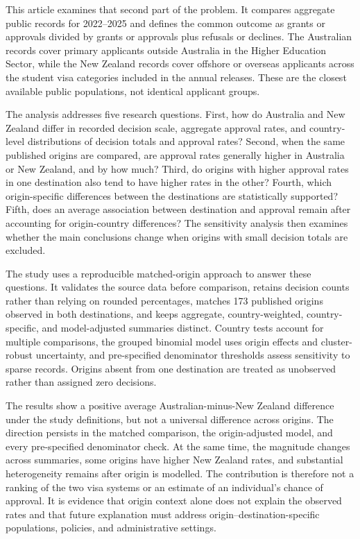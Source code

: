 \documentclass[runningheads]{llncs}
\begin{document}
This article examines that second part of the problem. It compares aggregate public records for 2022--2025 and defines the common outcome as grants or approvals divided by grants or approvals plus refusals or declines. The Australian records cover primary applicants outside Australia in the Higher Education Sector, while the New Zealand records cover offshore or overseas applicants across the student visa categories included in the annual releases. These are the closest available public populations, not identical applicant groups.

The analysis addresses five research questions. First, how do Australia and New Zealand differ in recorded decision scale, aggregate approval rates, and country-level distributions of decision totals and approval rates? Second, when the same published origins are compared, are approval rates generally higher in Australia or New Zealand, and by how much? Third, do origins with higher approval rates in one destination also tend to have higher rates in the other? Fourth, which origin-specific differences between the destinations are statistically supported? Fifth, does an average association between destination and approval remain after accounting for origin-country differences? The sensitivity analysis then examines whether the main conclusions change when origins with small decision totals are excluded.

The study uses a reproducible matched-origin approach to answer these questions. It validates the source data before comparison, retains decision counts rather than relying on rounded percentages, matches 173 published origins observed in both destinations, and keeps aggregate, country-weighted, country-specific, and model-adjusted summaries distinct. Country tests account for multiple comparisons, the grouped binomial model uses origin effects and cluster-robust uncertainty, and pre-specified denominator thresholds assess sensitivity to sparse records. Origins absent from one destination are treated as unobserved rather than assigned zero decisions.

The results show a positive average Australian-minus-New Zealand difference under the study definitions, but not a universal difference across origins. The direction persists in the matched comparison, the origin-adjusted model, and every pre-specified denominator check. At the same time, the magnitude changes across summaries, some origins have higher New Zealand rates, and substantial heterogeneity remains after origin is modelled. The contribution is therefore not a ranking of the two visa systems or an estimate of an individual's chance of approval. It is evidence that origin context alone does not explain the observed rates and that future explanation must address origin--destination-specific populations, policies, and administrative settings.
\end{document}

